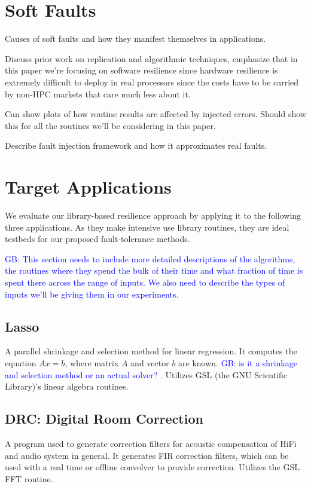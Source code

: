 \documentclass[prodmode,acmtecs]{acmsmall} %
\newcommand{\greg}[1]{%
  \textcolor{blue}{GB: #1}
}
\begin{document}
\section{Soft Faults}
\label{sec:soft_faults}

Causes of soft faults and how they manifest themselves in applications.

Discuss prior work on replication and algorithmic techniques, emphasize that in this paper we're focusing on software resilience since hardware resilience is extremely difficult to deploy in real processors since the costs have to be carried by non-HPC markets that care much less about it.

Can show plots of how routine results are affected by injected errors. Should show this for all the routines we'll be considering in this paper.

Describe fault injection framework and how it approximates real faults.

\section{Target Applications}
\label{sec:apps}

We evaluate our library-based resilience approach by applying it to the following three applications.
As they make intensive use library routines, they are ideal testbeds for our proposed fault-tolerance methods.

\greg{This section needs to include more detailed descriptions of the algorithms, the routines where they spend the bulk of their time and what fraction of time is spent there across the range of inputs. We also need to describe the types of inputs we'll be giving them in our experiments.}
\subsection{Lasso}
\label{sec:apps:lasso}
A parallel shrinkage and selection method for linear regression. It computes the equation $Ax=b$, where matrix $A$ and vector $b$ are known. \greg{is it a shrinkage and selection method or an actual solver?}. Utilizes GSL (the GNU Scientific Library)'s linear algebra routines.

\subsection{DRC: Digital Room Correction}
\label{sec:apps:drc}

A program used to generate correction filters for acoustic compensation of HiFi and audio system in general. It generates FIR correction filters, which can be used with a real time or offline convolver to provide correction. Utilizes the GSL FFT routine.
\end{document}
